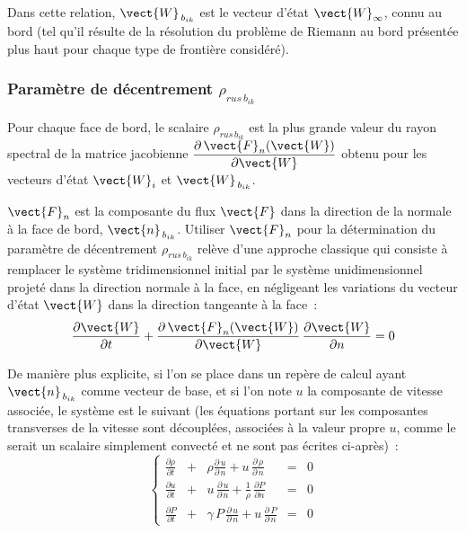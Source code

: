 Dans cette relation, $\vect{W}_{\,{b}_{ik}}$ est  le vecteur d'état
$\vect{W}_{\infty}$, connu au bord (tel
qu'il résulte de la résolution du problème de Riemann au bord
présentée plus haut pour chaque type de frontière considéré).

\subsubsection*{Paramètre de décentrement $\rho_{rus\,{b}_{ik}}$}

Pour chaque face de bord, le scalaire $\rho_{rus\,{b}_{ik}}$ est la
plus grande valeur du rayon spectral de la matrice jacobienne
$\displaystyle\frac{\partial\,\vect{F}_n(\vect{W})}{\partial \vect{W}}$
obtenu pour les vecteurs d'état $\vect{W}_i$ et $\vect{W}_{\,{b}_{ik}}$.

$\vect{F}_n$ est la composante du
flux $\vect{F}$ dans la direction de la normale à la face de bord,
$\vect{n}_{\,{b}_{ik}}$. Utiliser $\vect{F}_n$
pour la détermination du
paramètre de décentrement $\rho_{rus\,{b}_{ik}}$
relève d'une approche classique qui consiste
à remplacer le système tridimensionnel
initial par le système unidimensionnel projeté dans la direction
normale à la face, en négligeant les variations du vecteur d'état
$\vect{W}$ dans la direction tangeante à la face~:
\begin{equation}
\displaystyle\frac{\partial \vect{W}}{\partial t} +\frac{\partial\,\vect{F}_n(\vect{W})}{\partial
\vect{W}}\,\frac{\partial \vect{W}}{\partial n} = 0
\end{equation}

De manière plus explicite, si l'on se place dans un repère de calcul ayant
$\vect{n}_{\,{b}_{ik}}$ comme  vecteur de base, et si l'on note $u$ la
composante de vitesse associée, le système est le suivant (les équations
portant sur les composantes transverses de la vitesse sont découplées,
associées à la valeur propre $u$, comme le serait un scalaire simplement
convecté et ne sont pas écrites ci-après)~:
\begin{equation}
\left\{\begin{array}{lllll}
\displaystyle\frac{\partial\rho}{\partial t}
&+&\displaystyle\rho\frac{\partial\,u}{\partial\,n} + u\,\frac{\partial\,\rho}{\partial\,n}&=& 0 \\
\displaystyle\frac{\partial u}{\partial t}
&+&\displaystyle u\,\frac{\partial\,u}{\partial\,n}+\frac{1}{\rho}\,\frac{\partial
P}{\partial n} &=& 0 \\
\displaystyle\frac{\partial P}{\partial t}
&+&\displaystyle\gamma\,P\,\frac{\partial\,u}{\partial\,n}+u\,\frac{\partial\,P}{\partial\,n}&=& 0
\end{array}\right.
\end{equation}

